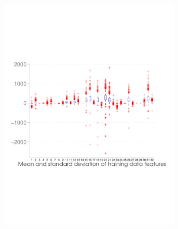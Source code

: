 \begin{figure}[h]
	\begin{subfigure}[b]{0.5\textwidth}
   \includegraphics[width=\textwidth]{figures/classification_distribution.pdf}
    \label{fig:dist_classification}
  \end{subfigure}
  \hfill
  \begin{subfigure}[b]{0.45\textwidth}

\end{subfigure}
\end{figure}
